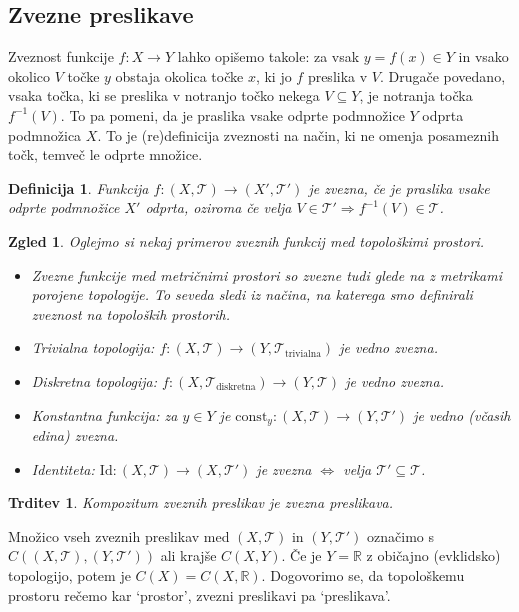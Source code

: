 \documentclass[10pt, a4paper]{article}
\newtheorem{trditev}[izr]{Trditev}
\newtheorem{defi}{Definicija}[section]
\newenvironment{noticeB}{%
  \tcolorbox[%
  notitle,
  empty,
  enhanced,  %
  breakable,
  coltext=black,
  colback=white, 
  fontupper=\rmfamily,
  parbox=false,
  noparskip,
  sharp corners,
  boxrule=-1pt,  %
  frame hidden,
  left=7pt,  %
  right=7pt,
  top=5pt,
  bottom=5pt,
  before skip=2.5ex plus 2pt,
  after skip=2.5ex plus 2pt,
  borderline west = {1.5pt}{-0.1pt}{blue!30!black}, %
  overlay unbroken and last={%
    \draw[color=black, line width=1.25pt]
    ($(frame.south west)+(1.pt, -0.1pt)$) -- ++(2em, 0);
  }
  ]}
{\endtcolorbox}
\newenvironment{definicija}{\begin{defi}\begin{noticeB}}{%
    \end{noticeB}\end{defi}}
\newtheorem{zgled}{Zgled}[section]
\newcommand{\R}{\mathbb {R}}
\begin{document}
\subsection{Zvezne preslikave}

Zveznost funkcije $f: X \to Y$ lahko opišemo takole: za vsak $y = f(x) \in Y$
in vsako okolico $V$ točke $y$ obstaja okolica točke $x$, ki jo $f$ preslika v $V$.
Drugače povedano, vsaka točka, ki se preslika v notranjo točko nekega $V \subseteq Y$,
je notranja točka $f^{-1} (V)$. To pa pomeni, da je praslika vsake odprte podmnožice $Y$ odprta podmnožica $X$.
To je (re)definicija zveznosti na način, ki ne omenja posameznih točk, temveč le odprte množice.

\begin{definicija}
  Funkcija $f: (X, \mathcal{T}) \to (X', \mathcal{T}')$ je zvezna, če je praslika 
  vsake odprte podmnožice $X'$ odprta, oziroma če velja $V \in \mathcal{T}' \Rightarrow f^{-1} (V) \in \mathcal{T}$.
\end{definicija}

\begin{zgled}
  Oglejmo si nekaj primerov zveznih funkcij med topološkimi prostori.
  \begin{itemize}
    \item Zvezne funkcije med metričnimi prostori so zvezne tudi glede na z metrikami porojene topologije.
    To seveda sledi iz načina, na katerega smo definirali zveznost na topoloških prostorih.
    \item Trivialna topologija: $f: (X, \mathcal{T}) \to (Y, \mathcal{T}_{\text{trivialna}})$ je vedno zvezna.
    \item Diskretna topologija: $f: (X, \mathcal{T}_{\text{diskretna}}) \to (Y, \mathcal{T})$ je vedno zvezna.
    \item Konstantna funkcija: za $y \in Y$ je $\mathrm{const}_y : (X, \mathcal{T}) \to (Y, \mathcal{T}')$ je vedno (včasih edina) zvezna.
    \item Identiteta: $\mathrm{Id}: (X, \mathcal{T}) \to (X, \mathcal{T'})$ je zvezna $\Leftrightarrow$ velja $\mathcal{T}' \subseteq \mathcal{T}$.
  \end{itemize}
\end{zgled}

\begin{trditev}
  Kompozitum zveznih preslikav je zvezna preslikava.
\end{trditev}

Množico vseh zveznih preslikav med $(X, \mathcal{T})$ in $(Y, \mathcal{T}')$ označimo s $C((X, \mathcal{T}), (Y, \mathcal{T}'))$ ali krajše $C(X, Y)$.
Če je $Y = \R$ z običajno (evklidsko) topologijo, potem je $C(X) = C(X, \R)$.
Dogovorimo se, da topološkemu prostoru rečemo kar  `prostor', zvezni preslikavi pa `preslikava'.
\end{document}
